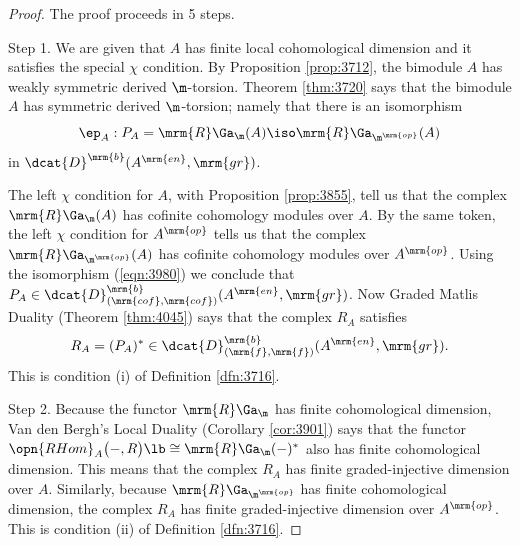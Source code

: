 \begin{proof} 
The proof proceeds in 5 steps. 

\smallskip \noindent 
Step 1. We are given that $A$ has finite local cohomological dimension and it 
satisfies the special $\chi$ condition. By Proposition \ref{prop:3712}, the 
bimodule $A$ has weakly symmetric derived $\m$-torsion. Theorem \ref{thm:3720} 
says that the bimodule $A$ has symmetric derived $\m$-torsion; namely that there 
is an isomorphism 
\begin{equation} \label{eqn:3980}
\ep_A : P_A = \mrm{R} \Ga_{\m}(A) \iso \mrm{R} \Ga_{\m^{\mrm{op}}}(A) 
\end{equation}
in $\dcat{D}^{\mrm{b}}(A^{\mrm{en}}, \mrm{gr})$. 

The left $\chi$ condition for $A$, with Proposition \ref{prop:3855}, tell us 
that the complex $\mrm{R} \Ga_{\m}(A)$ has cofinite cohomology modules over 
$A$. By the same token, the left $\chi$ condition for $A^{\mrm{op}}$
tells us that the complex $\mrm{R} \Ga_{\m^{\mrm{op}}}(A)$ has cofinite 
cohomology modules over $A^{\mrm{op}}$. Using the isomorphism (\ref{eqn:3980}) 
we conclude that 
$P_A \in \dcat{D}^{\mrm{b}}_{(\mrm{cof}, \mrm{cof})}(A^{\mrm{en}}, \mrm{gr})$.
Now Graded Matlis Duality (Theorem \ref{thm:4045}) says that the complex $R_A$ 
satisfies 
\begin{equation} \label{eqn:4582}
R_A = (P_A)^* \in 
\dcat{D}^{\mrm{b}}_{(\mrm{f}, \mrm{f})}(A^{\mrm{en}}, \mrm{gr}) .
\end{equation}
This is condition (i) of Definition \ref{dfn:3716}. 

\medskip \noindent Step 2. 
Because the functor $\mrm{R} \Ga_{\m}$ has finite cohomological dimension, 
Van den Bergh's Local Duality (Corollary \ref{cor:3901})
says that the functor 
$\opn{RHom}_A \bigl( -, R \bigr) \lb \cong \mrm{R} \Ga_{\m}(-)^*$
also has finite cohomological dimension. This means that the complex $R_A$ has 
finite graded-injective dimension over $A$. Similarly, because 
$\mrm{R} \Ga_{\m^{\mrm{op}}}$ has finite cohomological dimension, the complex 
$R_A$ has finite graded-injective dimension over $A^{\mrm{op}}$. 
This is condition (ii) of Definition \ref{dfn:3716}.


\end{proof}
